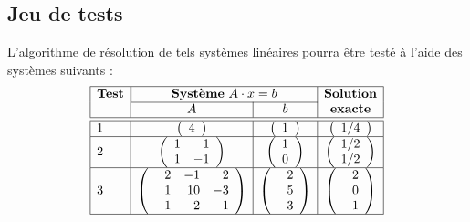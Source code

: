 \subsection*{Jeu de tests}
L'algorithme de résolution de tels systèmes linéaires pourra être testé
à l'aide des systèmes suivants :
$$\begin{array}{|l|c|c|c|}
\hline
\mbox{\bf Test} & \multicolumn{2}{|c|}{\mbox{{\bf Système} $A\cdot x = b$}} & \bf Solution\\
\cline{2-3}
                & A & b & \bf exacte \\
\hline
\hline
1 
& 
\left(\begin{array}{r}
4
\end{array}\right) 
&
\left(\begin{array}{r}
1
\end{array}\right) 
&
\displaystyle
\left(\begin{array}{r}
1/4
\end{array}\right)\\
\hline
2 
& 
\left(\begin{array}{rr}
1 & 1 \\
1 & -1
\end{array}\right) 
&
\left(\begin{array}{r}
1 \\ 0
\end{array}\right)
&
\displaystyle
\left(\begin{array}{r}
1/2 \\ 1/2
\end{array}\right)
\\
\hline
3 
& 
\left(\begin{array}{rrr}
2 & -1 & 2 \\
1 & 10 & -3 \\
-1 & 2 & 1
\end{array}\right) 
&
\left(\begin{array}{r}
2 \\ 5 \\ -3
\end{array}\right)
&
\left(\begin{array}{r}
2 \\ 0 \\ -1
\end{array}\right)
\\
\hline
\end{array}$$


